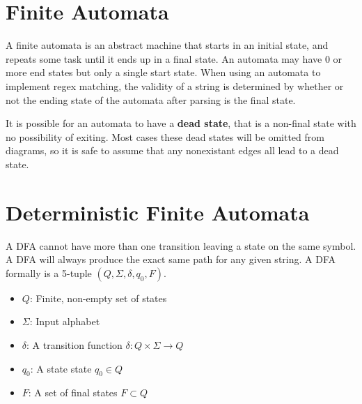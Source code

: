 \documentclass[11pt]{article}
\begin{document}
\section{Finite Automata}
	A finite automata is an abstract machine that starts in an initial state, and repeats some task until it ends up in a final state. An automata may have 0 or more end states but only a single start state. When using an automata to implement regex matching, the validity of a string is determined by whether or not the ending state of the automata after parsing is the final state.
	
	It is possible for an automata to have a \textbf{dead state}, that is a non-final state with no possibility of exiting. Most cases these dead states will be omitted from diagrams, so it is safe to assume that any nonexistant edges all lead to a dead state.
	
	\begin{center}
	\end{center}
	
\section{Deterministic Finite Automata}
	A DFA cannot have more than one transition leaving a state on the same symbol. A DFA will always produce the exact same path for any given string. A DFA formally is a 5-tuple $(Q, \Sigma, \delta, q_0, F)$.
	\begin{itemize}
		\item $Q$: Finite, non-empty set of states
		\item $\Sigma$: Input alphabet
		\item $\delta$: A transition function $\delta : Q\times \Sigma \rightarrow Q$
		\item $q_0$: A state state $q_0 \in Q$
		\item $F$: A set of final states $F \subset Q$
	\end{itemize}
	
\end{document}
